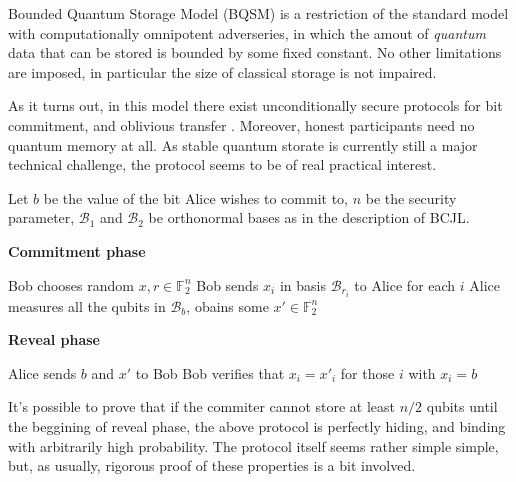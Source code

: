 \documentclass[10pt]{article}
\begin{document}
Bounded Quantum Storage Model (BQSM) is a restriction of the standard model with computationally
omnipotent adverseries, in which the amout of \emph{quantum} data that can be stored is bounded by
some fixed constant. No other limitations are imposed, in particular the size of classical storage
is not impaired\footnotemark. 


As it turns out, in this model there exist unconditionally secure protocols for bit commitment, and
oblivious transfer \cite{Damgard05}. Moreover, honest participants need no quantum memory at all. As
stable quantum storate is currently still a major technical challenge, the protocol seems to be of real
practical interest.

Let \(b\) be the value of the bit Alice wishes to commit to, \(n\) be the security parameter,
\(\mathcal{B}_1\) and \(\mathcal{B}_2\) be orthonormal bases as in the description of BCJL.

\vspace{2mm}

\NoCaptionOfAlgo
\begin{algorithm}[H]
\caption{\textbf{Commitment phase}}
Bob chooses random \(x, r\in\mathbb{F}_2^n\) \;
Bob sends \(x_i\) in basis \(\mathcal{B}_{r_i}\) to Alice for each \(i\) \;
Alice measures all the qubits in \(\mathcal{B}_b\), obains some \(x'\in\mathbb{F}_2^n\) \;
\end{algorithm}

\vspace{2mm}

\NoCaptionOfAlgo
\begin{algorithm}[H]
\caption{\textbf{Reveal phase}}
Alice sends \(b\) and \(x'\) to Bob \;
Bob verifies that \(x_i=x'_i\) for those \(i\) with \(x_i=b\)
\end{algorithm}

\vspace{2mm}

It's possible to prove that if the commiter cannot store at least \(n/2\) qubits until the beggining
of reveal phase, the above protocol is perfectly hiding, and binding with arbitrarily high probability.
The protocol itself seems rather simple simple, but, as usually, rigorous proof of  these properties
is a bit involved.
\end{document}
